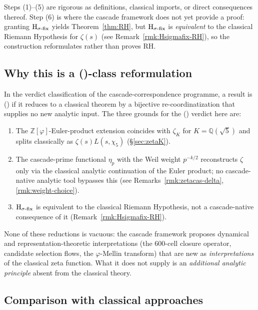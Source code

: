 \documentclass[11pt, a4paper]{amsart}
\theoremstyle{definition}
\newcommand{\Z}{\mathbb{Z}}
\newcommand{\Q}{\mathbb{Q}}
\newcommand{\pphi}{\varphi}
\begin{document}
Steps (1)--(5) are rigorous as definitions, classical imports, or
direct consequences thereof. Step (6) is where the cascade
framework does not yet provide a proof: granting
$\textup{H}_{\sigma\text{-fix}}$ yields Theorem~\ref{thm:RH}, but
$\textup{H}_{\sigma\text{-fix}}$ is \emph{equivalent} to the
classical Riemann Hypothesis for $\zeta(s)$ (see
Remark~\ref{rmk:Hsigmafix-RH}), so the construction reformulates
rather than proves RH.

\subsection{Why this is a (\textdelta)-class reformulation}

In the verdict classification of the cascade-correspondence
programme, a result is (\textdelta) if it reduces to a classical
theorem by a bijective re-coordinatization that supplies no new
analytic input. The three grounds for the (\textdelta) verdict
here are:
\begin{enumerate}
\item The $\Z[\pphi]$-Euler-product extension coincides with
$\zeta_K$ for $K = \Q(\sqrt{5})$ and splits classically as
$\zeta(s) L(s, \chi_5)$ (\S\ref{sec:zetaK}).
\item The cascade-prime functional $\eta_p$ with the Weil weight
$p^{-k/2}$ reconstructs $\zeta$ only via the classical analytic
continuation of the Euler product; no cascade-native analytic tool
bypasses this (see
Remarks~\ref{rmk:zetacas-delta}, \ref{rmk:weight-choice}).
\item $\textup{H}_{\sigma\text{-fix}}$ is equivalent to the
classical Riemann Hypothesis, not a cascade-native consequence
of it (Remark~\ref{rmk:Hsigmafix-RH}).
\end{enumerate}

None of these reductions is vacuous: the cascade framework
proposes dynamical and representation-theoretic interpretations
(the 600-cell closure operator, candidate selection flows, the
$\pphi$-Mellin transform) that are new as \emph{interpretations}
of the classical zeta function. What it does not supply is an
\emph{additional analytic principle} absent from the classical
theory.

\subsection{Comparison with classical approaches}
\end{document}
